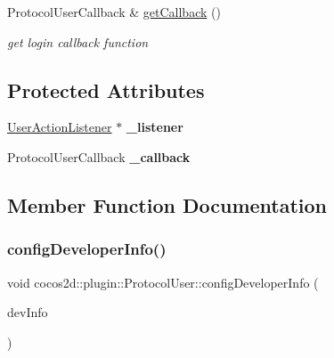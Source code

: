 \begin{DoxyCompactItemize}
\mbox{\label{classcocos2d_1_1plugin_1_1ProtocolUser_a88e22c750cb01004a360ebbf40a5f090}} 
Protocol\+User\+Callback \& \hyperlink{classcocos2d_1_1plugin_1_1ProtocolUser_a88e22c750cb01004a360ebbf40a5f090}{get\+Callback} ()
\begin{DoxyCompactList}\small\item\em get login callback function \end{DoxyCompactList}\end{DoxyCompactItemize}
\subsection*{Protected Attributes}
\begin{DoxyCompactItemize}
\item 
\mbox{\label{classcocos2d_1_1plugin_1_1ProtocolUser_a8f13b0bfc390f4b3fc35358475ae21e9}} 
\hyperlink{classcocos2d_1_1plugin_1_1UserActionListener}{User\+Action\+Listener} $\ast$ {\bfseries \+\_\+listener}
\item 
\mbox{\label{classcocos2d_1_1plugin_1_1ProtocolUser_a49c788b1c839a8ecfba335f8d9305ed6}} 
Protocol\+User\+Callback {\bfseries \+\_\+callback}
\end{DoxyCompactItemize}


\subsection{Member Function Documentation}
\mbox{\label{classcocos2d_1_1plugin_1_1ProtocolUser_a7a0064ab0a82d78b6ebb0b6c20cfed26}} 
\subsubsection{\texorpdfstring{config\+Developer\+Info()}{configDeveloperInfo()}}
{\footnotesize\ttfamily void cocos2d\+::plugin\+::\+Protocol\+User\+::config\+Developer\+Info (\begin{DoxyParamCaption}\item[{T\+User\+Developer\+Info}]{dev\+Info }\end{DoxyParamCaption})}



